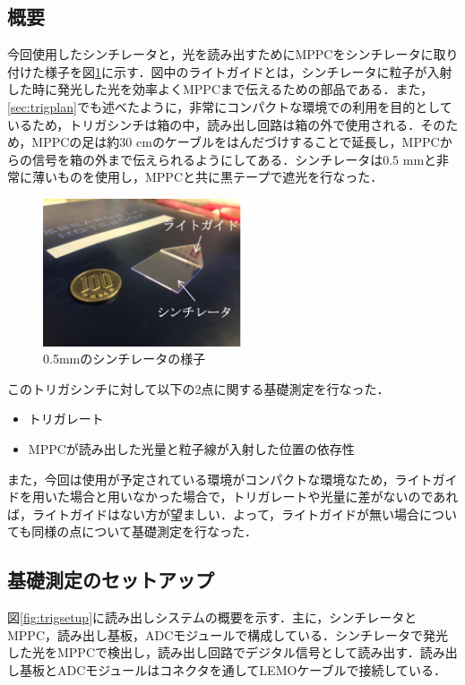 \subsection{概要}
今回使用したシンチレータと，光を読み出すためにMPPCをシンチレータに取り付けた様子を図\ref{fig:trigscin}に示す．図中のライトガイドとは，シンチレータに粒子が入射した時に発光した光を効率よくMPPCまで伝えるための部品である．また，\ref{sec:trigplan}でも述べたように，非常にコンパクトな環境での利用を目的としているため，トリガシンチは箱の中，読み出し回路は箱の外で使用される．そのため，MPPCの足は約30 $\mathrm{cm}$のケーブルをはんだづけすることで延長し，MPPCからの信号を箱の外まで伝えられるようにしてある．シンチレータは0.5 $\mathrm{mm}$と非常に薄いものを使用し，MPPCと共に黒テープで遮光を行なった．

\begin{figure}[h]
  \centering
  \includegraphics[width=6cm]{./figure/trigscin.png}
  \caption{0.5mmのシンチレータの様子}
  \label{fig:trigscin}
\end{figure}


このトリガシンチに対して以下の2点に関する基礎測定を行なった．
\begin{itemize}
\item トリガレート 
\item MPPCが読み出した光量と粒子線が入射した位置の依存性
\end{itemize}

また，今回は使用が予定されている環境がコンパクトな環境なため，ライトガイドを用いた場合と用いなかった場合で，トリガレートや光量に差がないのであれば，ライトガイドはない方が望ましい．よって，ライトガイドが無い場合についても同様の点について基礎測定を行なった．

\subsection{基礎測定のセットアップ}
図\ref{fig:trigsetup}に読み出しシステムの概要を示す．主に，シンチレータとMPPC，読み出し基板，ADCモジュールで構成している．シンチレータで発光した光をMPPCで検出し，読み出し回路でデジタル信号として読み出す．読み出し基板とADCモジュールはコネクタを通してLEMOケーブルで接続している．

